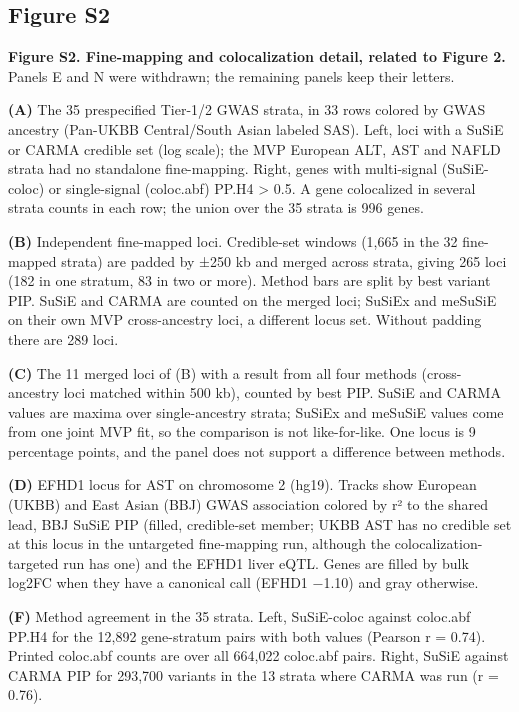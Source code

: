 \subsection{Figure S2}\label{figure-s2}

\textbf{Figure S2. Fine-mapping and colocalization detail, related to Figure 2.} Panels E and N were withdrawn; the remaining panels keep their letters.

\textbf{(A)} The 35 prespecified Tier-1/2 GWAS strata, in 33 rows colored by GWAS ancestry (Pan-UKBB Central/South Asian labeled SAS). Left, loci with a SuSiE or CARMA credible set (log scale); the MVP European ALT, AST and NAFLD strata had no standalone fine-mapping. Right, genes with multi-signal (SuSiE-coloc) or single-signal (coloc.abf) PP.H4 \textgreater{} 0.5. A gene colocalized in several strata counts in each row; the union over the 35 strata is 996 genes.

\textbf{(B)} Independent fine-mapped loci. Credible-set windows (1,665 in the 32 fine-mapped strata) are padded by ±250 kb and merged across strata, giving 265 loci (182 in one stratum, 83 in two or more). Method bars are split by best variant PIP. SuSiE and CARMA are counted on the merged loci; SuSiEx and meSuSiE on their own MVP cross-ancestry loci, a different locus set. Without padding there are 289 loci.

\textbf{(C)} The 11 merged loci of (B) with a result from all four methods (cross-ancestry loci matched within 500 kb), counted by best PIP. SuSiE and CARMA values are maxima over single-ancestry strata; SuSiEx and meSuSiE values come from one joint MVP fit, so the comparison is not like-for-like. One locus is 9 percentage points, and the panel does not support a difference between methods.

\textbf{(D)} EFHD1 locus for AST on chromosome 2 (hg19). Tracks show European (UKBB) and East Asian (BBJ) GWAS association colored by r² to the shared lead, BBJ SuSiE PIP (filled, credible-set member; UKBB AST has no credible set at this locus in the untargeted fine-mapping run, although the colocalization-targeted run has one) and the EFHD1 liver eQTL. Genes are filled by bulk log2FC when they have a canonical call (EFHD1 −1.10) and gray otherwise.

\textbf{(F)} Method agreement in the 35 strata. Left, SuSiE-coloc against coloc.abf PP.H4 for the 12,892 gene-stratum pairs with both values (Pearson r = 0.74). Printed coloc.abf counts are over all 664,022 coloc.abf pairs. Right, SuSiE against CARMA PIP for 293,700 variants in the 13 strata where CARMA was run (r = 0.76).

